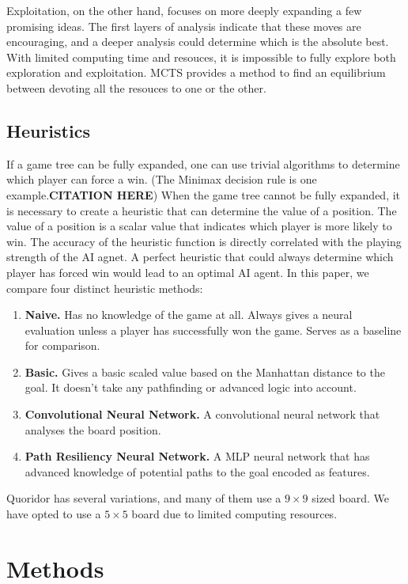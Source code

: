 \documentclass[10pt]{article}
\begin{document}
Exploitation, on the other hand, focuses on more deeply expanding a few promising ideas. The first layers of analysis indicate that these moves are encouraging, and a deeper analysis could determine which is the absolute best. With limited computing time and resouces, it is impossible to fully explore both exploration and exploitation. MCTS provides a method to find an equilibrium between devoting all the resouces to one or the other.

\subsection{Heuristics}

If a game tree can be fully expanded, one can use trivial algorithms to determine which player can force a win. (The Minimax decision rule is one example.\textbf{CITATION HERE}) When the game tree cannot be fully expanded, it is necessary to create a heuristic that can determine the value of a position. The value of a position is a scalar value that indicates which player is more likely to win. The accuracy of the heuristic function is directly correlated with the playing strength of the AI agnet. A perfect heuristic that could always determine which player has forced win would lead to an optimal AI agent. In this paper, we compare four distinct heuristic methods:

\begin{enumerate}
    \item \textbf{Naive.} Has no knowledge of the game at all. Always gives a neural evaluation unless a player has successfully won the game. Serves as a baseline for comparison.
    \item \textbf{Basic.} Gives a basic scaled value based on the Manhattan distance to the goal. It doesn't take any pathfinding or advanced logic into account.
    \item \textbf{Convolutional Neural Network.} A convolutional neural network that analyses the board position.
    \item \textbf{Path Resiliency Neural Network.} A MLP neural network that has advanced knowledge of potential paths to the goal encoded as features.
\end{enumerate}

Quoridor has several variations, and many of them use a $9 \times 9$ sized board. We have opted to use a $5 \times 5$ board due to limited computing resources. 

\section{Methods}
\end{document}
